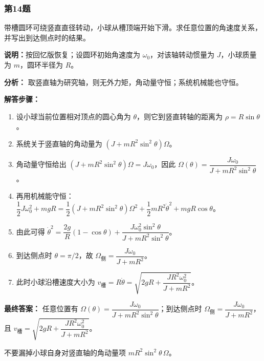 \documentclass[12pt,a4paper]{ctexart}
\begin{document}
\subsubsection*{第14题}
\begin{tcolorbox}[colback=gray!2!white,colframe=black!60,title={题目}]
带槽圆环可绕竖直直径转动，小球从槽顶端开始下滑。求任意位置的角速度关系，并写出到达侧点时的结果。\par
\vspace{0.4em}
\textbf{说明：}按回忆版恢复；设圆环初始角速度为 \(\omega_0\)，对该轴转动惯量为 \(J\)，小球质量为 \(m\)，圆环半径为 \(R\)。\par
\end{tcolorbox}
\begin{tcolorbox}[colback=blue!2!white,colframe=blue!55!black,title={完整答案}]
\textbf{分析：}
取竖直轴为研究轴，则无外力矩，角动量守恒；系统机械能也守恒。\par
\textbf{解答步骤：}
\begin{enumerate}
\item 设小球当前位置相对顶点的圆心角为 \(\theta\)，则它到竖直转轴的距离为 \(\rho=R\sin\theta\)。
\item 系统关于竖直轴的角动量为 \((J+mR^2\sin^2\theta)\Omega\)。
\item 角动量守恒给出 \((J+mR^2\sin^2\theta)\Omega=J\omega_0\)，因此 \(\Omega(\theta)=\dfrac{J\omega_0}{J+mR^2\sin^2\theta}\)。
\item 再用机械能守恒：\(\dfrac12J\omega_0^2+mgR=\dfrac12(J+mR^2\sin^2\theta)\Omega^2+\dfrac12mR^2\dot\theta^2+mgR\cos\theta\)。
\item 由此可得 \(\dot\theta^2=\dfrac{2g}{R}(1-\cos\theta)+\dfrac{J\omega_0^2\sin^2\theta}{J+mR^2\sin^2\theta}\)。
\item 到达侧点时 \(\theta=\pi/2\)，故 \(\Omega_{\text{侧}}=\dfrac{J\omega_0}{J+mR^2}\)。
\item 此时小球沿槽速度大小为 \(v_{\text{槽}}=R\dot\theta=\sqrt{2gR+\dfrac{JR^2\omega_0^2}{J+mR^2}}\)。
\end{enumerate}
\textbf{最终答案：}
任意位置有 \(\Omega(\theta)=\dfrac{J\omega_0}{J+mR^2\sin^2\theta}\)；到达侧点时 \(\Omega_{\text{侧}}=\dfrac{J\omega_0}{J+mR^2}\)，且 \(v_{\text{槽}}=\sqrt{2gR+\dfrac{JR^2\omega_0^2}{J+mR^2}}\)。\par
\end{tcolorbox}
\begin{tcolorbox}[colback=red!2!white,colframe=red!55!black,title={易错点}]
不要漏掉小球自身对竖直轴的角动量项 \(mR^2\sin^2\theta\,\Omega\)。\par
\end{tcolorbox}
\end{document}
